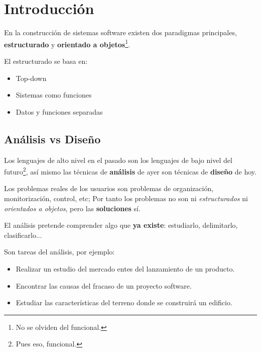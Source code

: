 
\section{Introducción}

En la construcción de sistemas software existen dos paradigmas principales, \textbf{estructurado} y \textbf{orientado a objetos}\footnote{No se olviden del funcional.}.

El estructurado se basa en:

\begin{itemize}[noitemsep]
\item Top-down
\item Sistemas como funciones
\item Datos y funciones separadas
\end{itemize}

\subsection{Análisis vs Diseño}

Los lenguajes de alto nivel en el pasado son los lenguajes de bajo nivel del futuro\footnote{Pues eso, funcional.}, así mismo las técnicas de \textbf{análisis} de ayer son técnicas de \textbf{diseño} de hoy.

Los problemas reales de los usuarios son problemas de organización, monitorización, control, etc; Por tanto los problemas no son ni \textit{estructurados} ni \textit{orientados a objetos}, pero las \textbf{soluciones} sí.

El análisis pretende comprender algo que \textbf{ya existe}: estudiarlo, delimitarlo, clasificarlo...

Son tareas del análisis, por ejemplo:

\begin{itemize}[noitemsep]
\item Realizar un estudio del mercado entes del lanzamiento de un producto.
\item Encontrar las causas del fracaso de un proyecto software.
\item Estudiar las características del terreno donde se construirá un edificio.
\end{itemize}

